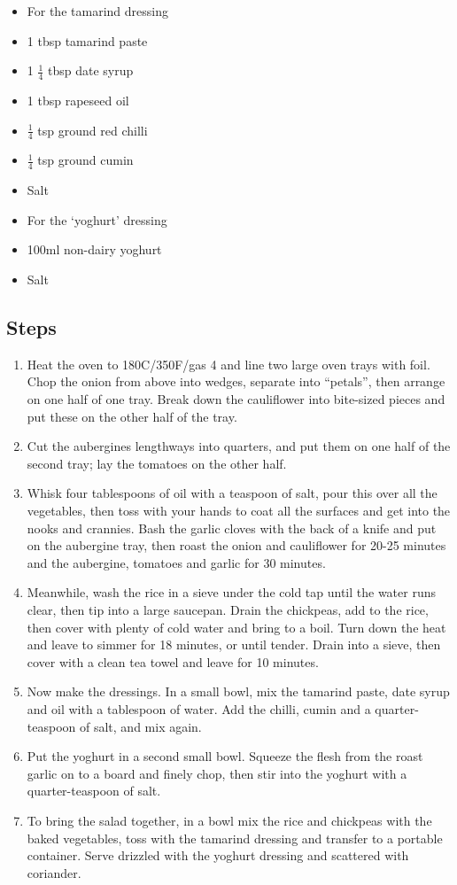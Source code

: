 \documentclass{book}
\begin{document}
\begin{itemize}
\item For the tamarind dressing 
\item 1 tbsp tamarind paste
\item 1 $\frac{1}{4}$ tbsp date syrup 
\item 1 tbsp rapeseed oil 
\item $\frac{1}{4}$ tsp ground red chilli 
\item $\frac{1}{4}$ tsp ground cumin
\item Salt
\end{itemize}

\begin{itemize}
\item For the ‘yoghurt’ dressing
\item 100ml non-dairy yoghurt
\item Salt
\end{itemize}

\subsection*{Steps}
\begin{enumerate}
\item Heat the oven to 180C/350F/gas 4 and line two large oven trays with foil. Chop the onion from above into wedges, separate into “petals”, then arrange on one half of one tray. Break down the cauliflower into bite-sized pieces and put these on the other half of the tray.
\item Cut the aubergines lengthways into quarters, and put them on one half of the second tray; lay the tomatoes on the other half.
\item Whisk four tablespoons of oil with a teaspoon of salt, pour this over all the vegetables, then toss with your hands to coat all the surfaces and get into the nooks and crannies. Bash the garlic cloves with the back of a knife and put on the aubergine tray, then roast the onion and cauliflower for 20-25 minutes and the aubergine, tomatoes and garlic for 30 minutes.
\item Meanwhile, wash the rice in a sieve under the cold tap until the water runs clear, then tip into a large saucepan. Drain the chickpeas, add to the rice, then cover with plenty of cold water and bring to a boil. Turn down the heat and leave to simmer for 18 minutes, or until tender. Drain into a sieve, then cover with a clean tea towel and leave for 10 minutes.
\item Now make the dressings. In a small bowl, mix the tamarind paste, date syrup and oil with a tablespoon of water. Add the chilli, cumin and a quarter-teaspoon of salt, and mix again.
\item Put the yoghurt in a second small bowl. Squeeze the flesh from the roast garlic on to a board and finely chop, then stir into the yoghurt with a quarter-teaspoon of salt.
\item To bring the salad together, in a bowl mix the rice and chickpeas with the baked vegetables, toss with the tamarind dressing and transfer to a portable container. Serve drizzled with the yoghurt dressing and scattered with coriander.
\end{enumerate}
\newpage
\end{document}
